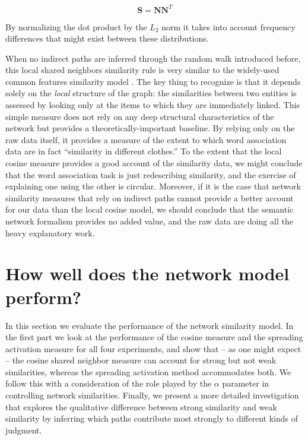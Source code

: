 \documentclass[doc]{apa6}
\begin{document}
\begin{equation}
\mathbf{S} = \mathbf{N}\mathbf{N}^T
\end{equation}

\noindent
By normalizing the dot product by the $L_2$ norm it takes into account frequency differences that might exist between these distributions.

When no indirect paths are inferred through the random walk introduced before, this local shared neighbors similarity rule is very similar to the widely-used common features similarity model \parencite{Tversky1977}. The key thing to recognize is that it depends solely on the {\it local} structure of the graph: the similarities between two entities is assessed by looking only at the items to which they are immediately linked.
This simple measure does not rely on any deep structural characteristics of the network but provides a theoretically-important baseline. By relying only on the raw data itself, it provides a measure of the extent to which word association data are in fact ``similarity in different clothes.'' To the extent that the local cosine measure provides a good account of the similarity data, we might conclude that the word association task is just redescribing similarity, and the exercise of explaining one using the other is circular. Moreover, if it is the case that network similarity measures that rely on indirect paths cannot provide a better account for our data than the local cosine model, we should conclude that the semantic network formalism provides no added value, and the raw data are doing all the heavy explanatory work.


\section{How well does the network model perform?}

In this section we evaluate the performance of the network similarity model. In the first part we look at the performance of the cosine measure and the spreading activation measure for all four experiments, and show that -- as one might expect -- the cosine shared neighbor measure can account for strong but not weak similarities, whereas the spreading activation method accommodates both. We follow this with a consideration of the role played by the $\alpha$ parameter in controlling network similarities. Finally, we present a more detailed investigation that explores the qualitative difference between strong similarity and weak similarity by inferring which paths contribute most strongly to different kinds of judgment.
\end{document}
